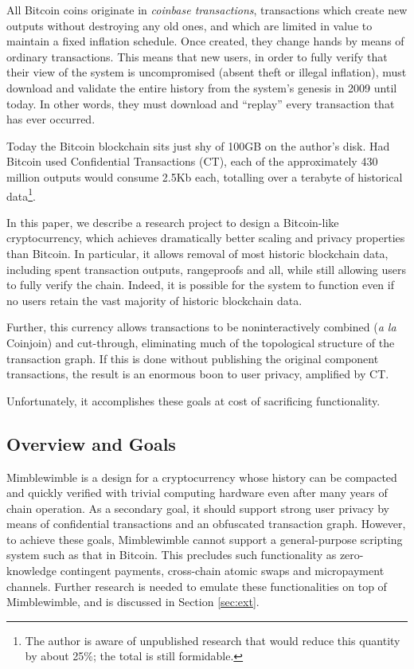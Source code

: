 \documentclass[letterpaper]{article}
\begin{document}
All Bitcoin coins originate in \emph{coinbase transactions}, transactions which
create new outputs without destroying any old ones, and which are limited in
value to maintain a fixed inflation schedule. Once created, they change hands
by means of ordinary transactions. This means that new users, in order to
fully verify that their view of the system is uncompromised (absent theft or
illegal inflation), must download and validate the entire history from the
system's genesis in 2009 until today. In other words, they must download
and ``replay'' every transaction that has ever occurred.

Today the Bitcoin blockchain sits just shy of 100GB on the author's disk.
Had Bitcoin used Confidential Transactions\cite{maxwell2015} (CT), each of the
approximately 430 million outputs would consume 2.5Kb each, totalling over
a terabyte of historical data\footnote{The author is aware of unpublished
research that would reduce this quantity by about 25\%; the total is still
formidable.}.

In this paper, we describe a research project to design a Bitcoin-like
cryptocurrency, which achieves dramatically better scaling and privacy
properties than Bitcoin. In particular, it allows removal of most historic
blockchain data, including spent transaction outputs, rangeproofs and all,
while still allowing users to fully verify the chain. Indeed, it is
possible for the system to function even if no users retain the vast
majority of historic blockchain data.

Further, this currency allows transactions to be noninteractively
combined (\emph{a la} Coinjoin\cite{maxwell2013}) and cut-through\cite{maxwell2013-2},
eliminating much of the topological structure of the transaction graph.
If this is done without publishing the original component transactions,
the result is an enormous boon to user privacy, amplified by CT.

Unfortunately, it accomplishes these goals at cost of sacrificing functionality.

\subsection{Overview and Goals}

Mimblewimble is a design for a cryptocurrency whose history can be
compacted and quickly verified with trivial computing hardware even
after many years of chain operation. As a secondary goal, it should
support strong user privacy by means of confidential transactions
and an obfuscated transaction graph. However, to achieve these goals,
Mimblewimble cannot support a general-purpose scripting system such
as that in Bitcoin. This precludes such functionality as zero-knowledge
contingent payments\cite{maxwell2016}, cross-chain atomic swaps\cite{nolan2013}
and micropayment channels\cite{poon+dryja2016}. Further research is
needed to emulate these functionalities on top of Mimblewimble, and
is discussed in Section \ref{sec:ext}.
\end{document}
